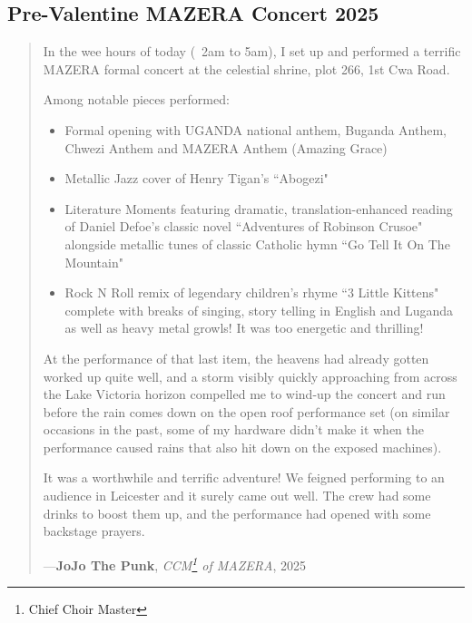 \documentclass[a4paper]{article}
\begin{document}
\subsection{Pre-Valentine MAZERA Concert 2025}
\label{SEC12b}

\noindent
\begin{minipage}{1\textwidth}
\vspace{1em}
\begin{quotation}
{\ttfamily

In the wee hours of today (~2am to 5am), I set up and performed a terrific MAZERA formal concert at the celestial shrine, plot 266, 1st Cwa Road.

Among notable pieces performed:

\begin{itemize}
\item Formal opening with UGANDA national anthem, Buganda Anthem, Chwezi Anthem and MAZERA Anthem (Amazing Grace)
\item Metallic Jazz cover of Henry Tigan's ``Abogezi"
\item Literature Moments featuring dramatic, translation-enhanced reading of Daniel Defoe's classic novel ``Adventures of Robinson Crusoe" alongside metallic tunes of classic Catholic hymn ``Go Tell It On The Mountain"
\item Rock N Roll remix of legendary children's rhyme ``3 Little Kittens" complete with breaks of singing, story telling in English and Luganda as well as heavy metal growls! It was too energetic and thrilling!
\end{itemize}

At the performance of that last item, the heavens had already gotten worked up quite well, and a storm visibly quickly approaching from across the Lake Victoria horizon compelled me to wind-up the concert and run before the rain comes down on the open roof performance set (on similar occasions in the past, some of my hardware didn't make it when the performance caused rains that also hit down on the exposed machines). 

It was a worthwhile and terrific adventure! We feigned performing to an audience in Leicester and it surely came out well. The crew had some drinks to boost them up, and the performance had opened with some backstage prayers.

}
\hspace*{\fill} ---\textbf{JoJo The Punk}, \textit{CCM\footnote{Chief Choir Master} of MAZERA}, 2025
\end{quotation}
\vspace{1em}
\end{minipage}
\end{document}

